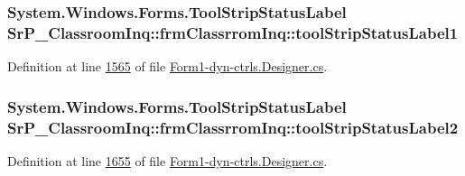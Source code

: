 \hypertarget{class_sr_p___classroom_inq_1_1frm_classrrom_inq_ad0f9f7002296a43527da34b1f476ce4e}{
\subsubsection[{tool\-Strip\-Status\-Label1}]{\setlength{\rightskip}{0pt plus 5cm}\-System.\-Windows.\-Forms.\-Tool\-Strip\-Status\-Label {\bf \-Sr\-P\-\_\-\-Classroom\-Inq\-::frm\-Classrrom\-Inq\-::tool\-Strip\-Status\-Label1}}}
\label{class_sr_p___classroom_inq_1_1frm_classrrom_inq_ad0f9f7002296a43527da34b1f476ce4e}


\-Definition at line \hyperlink{_form1-dyn-ctrls_8_designer_8cs_source_l01565}{1565} of file \hyperlink{_form1-dyn-ctrls_8_designer_8cs_source}{\-Form1-\/dyn-\/ctrls.\-Designer.\-cs}.

\hypertarget{class_sr_p___classroom_inq_1_1frm_classrrom_inq_a453e5015dbeaefcb4cab17266e8db6ad}{
\subsubsection[{tool\-Strip\-Status\-Label2}]{\setlength{\rightskip}{0pt plus 5cm}\-System.\-Windows.\-Forms.\-Tool\-Strip\-Status\-Label {\bf \-Sr\-P\-\_\-\-Classroom\-Inq\-::frm\-Classrrom\-Inq\-::tool\-Strip\-Status\-Label2}}}
\label{class_sr_p___classroom_inq_1_1frm_classrrom_inq_a453e5015dbeaefcb4cab17266e8db6ad}


\-Definition at line \hyperlink{_form1-dyn-ctrls_8_designer_8cs_source_l01655}{1655} of file \hyperlink{_form1-dyn-ctrls_8_designer_8cs_source}{\-Form1-\/dyn-\/ctrls.\-Designer.\-cs}.

